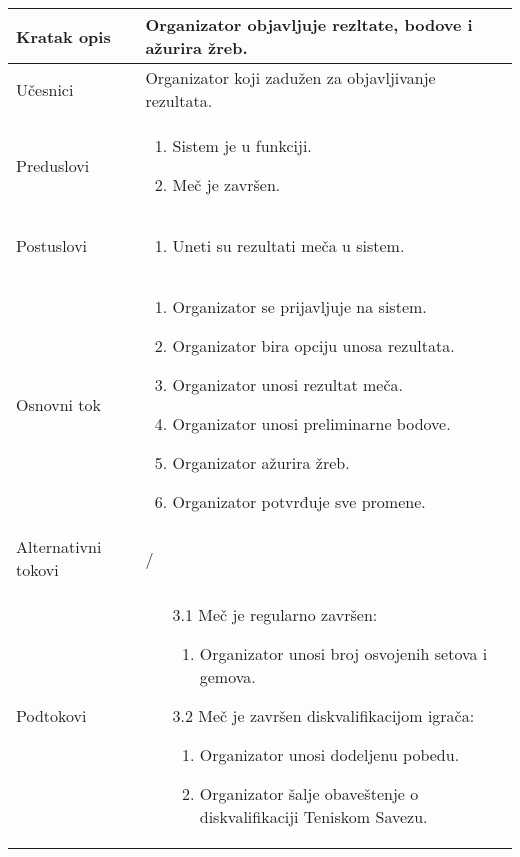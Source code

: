 \documentclass{article}
\begin{document}
\begin{longtable}{| p{} | p{} |} 
\hline
    Kratak opis & Organizator objavljuje rezltate, bodove i ažurira žreb.\\ 
\hline    
    Učesnici & 
         Organizator koji zadužen za objavljivanje rezultata.
    \\
\hline
   Preduslovi & \begin{enumerate}
       \item Sistem je u funkciji.
       \item Meč je završen.
   \end{enumerate}\\
\hline  
    Postuslovi & \begin{enumerate}
        \item Uneti su rezultati meča u sistem.
    \end{enumerate}\\
\hline
    Osnovni tok & \begin{enumerate}
        \item Organizator se prijavljuje na sistem.
        \item Organizator bira opciju unosa rezultata.
        \item Organizator unosi rezultat meča.
        \item Organizator unosi preliminarne bodove. 
        \item Organizator ažurira žreb.
        \item Organizator potvrđuje sve promene.
    \end{enumerate}\\
\hline
    Alternativni tokovi & /\\
\hline
    Podtokovi & \begin{enumerate}
        \item [3.1] Meč je regularno završen: \begin{enumerate}
                    \item Organizator unosi broj osvojenih setova i gemova.
                    \end{enumerate}
        \item [3.2] Meč je završen diskvalifikacijom igrača: \begin{enumerate}
                    \item Organizator unosi dodeljenu pobedu.
                    \item Organizator šalje obaveštenje o diskvalifikaciji Teniskom Savezu.
                    \end{enumerate}

\end{enumerate}
\end{longtable}
\end{document}
